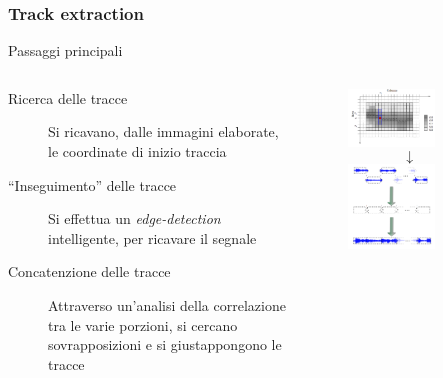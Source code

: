 \begin{frame}
\frametitle{Track extraction}
\begin{block}{Passaggi principali}
\begin{columns}
\begin{column}{6.5cm}
\begin{description}
\item[Ricerca delle tracce] Si ricavano, dalle immagini elaborate, le coordinate
di inizio traccia
\item[``Inseguimento'' delle tracce] Si effettua un \emph{edge-detection}
intelligente, per ricavare il segnale
\item[Concatenzione delle tracce] Attraverso un'analisi della correlazione
tra le varie porzioni, si cercano sovrapposizioni e si giustappongono le 
tracce
\end{description}
\end{column}
\vline
\begin{column}{3.5cm}
\begin{figure}
\includegraphics[width=0.7\textwidth]{immagini/track-following.png}
$$\downarrow$$
\vspace{0.2cm}
\includegraphics[width=0.7\textwidth]{immagini/concatenation.png}
\end{figure}
\end{column}
\end{columns}
\end{block}
\end{frame}
